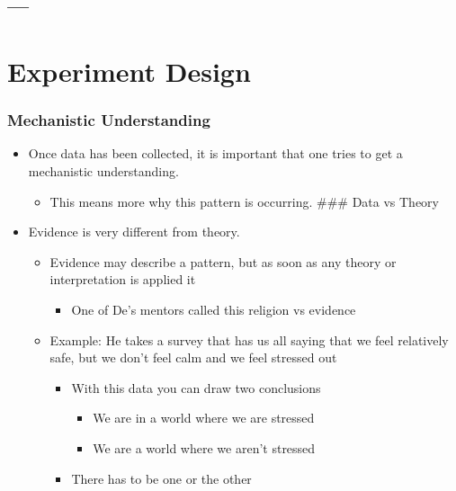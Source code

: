 \documentclass[letterpaper]{article}
\date{\today}
\title{}
\renewcommand{\tableofcontents}{}
\begin{document}
\tableofcontents



\subsection{---}
\label{sec:org5dc79c6}
\section{Experiment Design}
\label{sec:orgdb7cd67}
\subsubsection{Mechanistic Understanding}
\label{sec:org810db4c}
\begin{itemize}
\item Once data has been collected, it is important that one tries to get a
mechanistic understanding.

\begin{itemize}
\item This means more why this pattern is occurring. \#\#\# Data vs Theory
\end{itemize}

\item Evidence is very different from theory.

\begin{itemize}
\item Evidence may describe a pattern, but as soon as any theory or
interpretation is applied it

\begin{itemize}
\item One of De's mentors called this religion vs evidence
\end{itemize}

\item Example: He takes a survey that has us all saying that we feel
relatively safe, but we don't feel calm and we feel stressed out

\begin{itemize}
\item With this data you can draw two conclusions

\begin{itemize}
\item We are in a world where we are stressed
\item We are a world where we aren't stressed
\end{itemize}

\item There has to be one or the other


\end{itemize}
\end{itemize}
\end{itemize}
\end{document}
